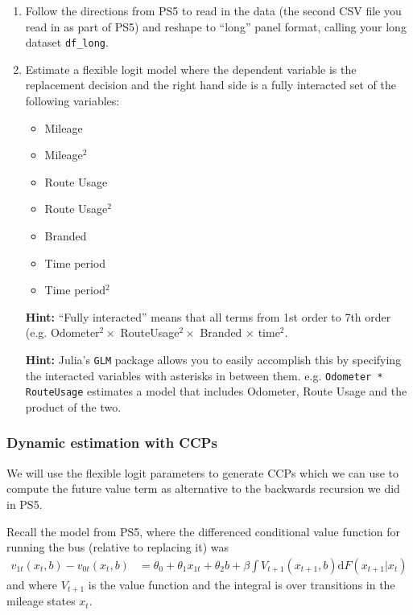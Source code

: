 \documentclass[12pt,english]{article}
\begin{document}
\begin{enumerate}
\item Follow the directions from PS5 to read in the data (the second CSV file you read in as part of PS5) and reshape to ``long'' panel format, calling your long dataset \texttt{df\_long}.

\item Estimate a flexible logit model where the dependent variable is the replacement decision and the right hand side is a fully interacted set of the following variables:
\begin{itemize}
    \item Mileage
    \item Mileage$^2$
    \item Route Usage
    \item Route Usage$^2$
    \item Branded
    \item Time period
    \item Time period$^2$
\end{itemize}

\textbf{Hint:} ``Fully interacted'' means that all terms from 1st order to 7th order (e.g. Odometer$^2 \times$ RouteUsage$^2 \times$ Branded $\times$ time$^2$.

\textbf{Hint:} Julia's \texttt{GLM} package allows you to easily accomplish this by specifying the interacted variables with asterisks in between them. e.g. \texttt{Odometer * RouteUsage} estimates a model that includes Odometer, Route Usage and the product of the two.
\end{enumerate}

\subsubsection*{Dynamic estimation with CCPs}
We will use the flexible logit parameters to generate CCPs which we can use to compute the future value term as alternative to the backwards recursion we did in PS5.

Recall the model from PS5, where the differenced conditional value function for running the bus (relative to replacing it) was
\begin{align}\label{eq:condv}
    v_{1t}\left(x_{t},b\right)-v_{0t}\left(x_{t},b\right) &= \theta_0 + \theta_1 x_{1t} + \theta_2 b + \beta \int V_{t+1}\left(x_{t+1},b\right) \mathrm{d}F\left(x_{t+1}\vert x_{t}\right)
\end{align}
and where $V_{t+1}$ is the value function and the integral is over transitions in the mileage states $x_{t}$.
\end{document}
